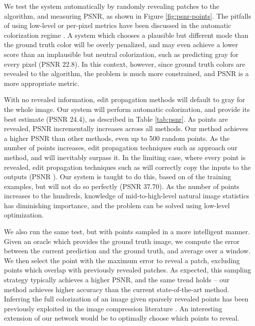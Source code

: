 \documentclass[acmtog,authorversion]{acmart}
\begin{document}
We test the system automatically by randomly revealing patches to the algorithm, and measuring PSNR, as shown in Figure \ref{fig:psnr-points}. The pitfalls of using low-level or per-pixel metrics have been discussed in the automatic colorization regime \cite{zhang2016colorful}. A system which chooses a plausible but different mode than the ground truth color will be overly penalized, and may even achieve a lower score than an implausible but neutral colorization, such as predicting gray for every pixel (PSNR 22.8). In this context, however, since ground truth colors are revealed to the algorithm, the problem is much more constrained, and PSNR is a more appropriate metric.

With no revealed information, edit propagation methods will default to gray for the whole image. Our system will perform automatic colorization, and provide its best estimate (PSNR 24.4), as described in Table \ref{tab:psnr}. As points are revealed, PSNR incrementally increases across all methods. Our method achieves a higher PSNR than other methods, even up to 500 random points. As the number of points increases, edit propagation techniques such as \cite{levin2004colorization} approach our method, and will inevitably surpass it. In the limiting case, where every point is revealed, edit propagation techniques such as \cite{levin2004colorization,poole2016fast,endo2016deepprop} will correctly copy the inputs to the outputs (PSNR ). Our system is taught to do this, based on  of the training examples, but will not do so perfectly (PSNR 37.70). As the number of points increases to the hundreds, knowledge of mid-to-high-level natural image statistics has diminishing importance, and the problem can be solved using low-level optimization.

We also run the same test, but with points sampled in a more intelligent manner. Given an oracle which provides the ground truth image, we compute the  error between the current prediction and the ground truth, and average over a  window. We then select the point with the maximum error to reveal a  patch, excluding points which overlap with previously revealed patches. As expected, this sampling strategy typically achieves a higher PSNR, and the same trend holds -- our method achieves higher accuracy than the current state-of-the-art method. Inferring the full colorization of an image given sparsely revealed points has been previously exploited in the image compression literature \cite{cheng2007learning,he2009unified}. An interesting extension of our network would be to optimally choose which points to reveal.
\end{document}
